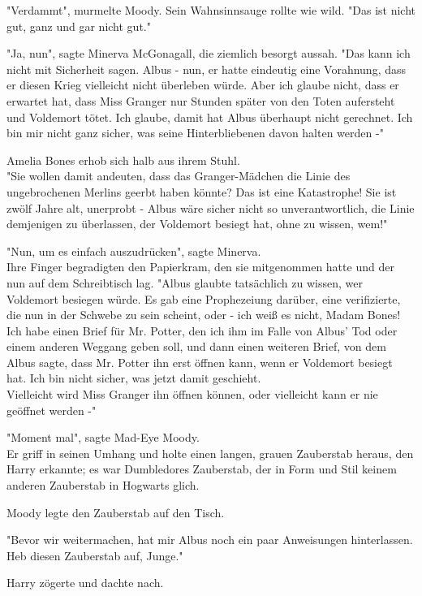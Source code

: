 {"Verdammt", murmelte Moody. Sein Wahnsinnsauge rollte wie wild. "Das ist nicht gut, ganz und gar nicht gut."

"Ja, nun", sagte Minerva McGonagall, die ziemlich besorgt aussah. "Das kann ich nicht mit Sicherheit sagen. Albus - nun, er hatte eindeutig eine Vorahnung, dass er diesen Krieg vielleicht nicht überleben würde. Aber ich glaube nicht, dass er erwartet hat, dass Miss Granger nur Stunden später von den Toten aufersteht und Voldemort tötet. Ich glaube, damit hat Albus überhaupt nicht gerechnet. Ich bin mir nicht ganz sicher, was seine Hinterbliebenen davon halten werden -"

Amelia Bones erhob sich halb aus ihrem Stuhl.\\ "Sie wollen damit andeuten, dass das Granger-Mädchen die Linie des ungebrochenen Merlins geerbt haben könnte? Das ist eine Katastrophe! Sie ist zwölf Jahre alt, unerprobt - Albus wäre sicher nicht so unverantwortlich, die Linie demjenigen zu überlassen, der Voldemort besiegt hat, ohne zu wissen, wem!"

"Nun, um es einfach auszudrücken", sagte Minerva.\\ Ihre Finger begradigten den Papierkram, den sie mitgenommen hatte und der nun auf dem Schreibtisch lag. "Albus glaubte tatsächlich zu wissen, wer Voldemort besiegen würde. Es gab eine Prophezeiung darüber, eine verifizierte, die nun in der Schwebe zu sein scheint, oder - ich weiß es nicht, Madam Bones! Ich habe einen Brief für Mr. Potter, den ich ihm im Falle von Albus' Tod oder einem anderen Weggang geben soll, und dann einen weiteren Brief, von dem Albus sagte, dass Mr. Potter ihn erst öffnen kann, wenn er Voldemort besiegt hat. Ich bin nicht sicher, was jetzt damit geschieht.\\ Vielleicht wird Miss Granger ihn öffnen können, oder vielleicht kann er nie geöffnet werden -"

"Moment mal", sagte Mad-Eye Moody.\\ Er griff in seinen Umhang und holte einen langen, grauen Zauberstab heraus, den Harry erkannte; es war Dumbledores Zauberstab, der in Form und Stil keinem anderen Zauberstab in Hogwarts glich.

Moody legte den Zauberstab auf den Tisch.

"Bevor wir weitermachen, hat mir Albus noch ein paar Anweisungen hinterlassen.\\ Heb diesen Zauberstab auf, Junge."

Harry zögerte und dachte nach.

}
